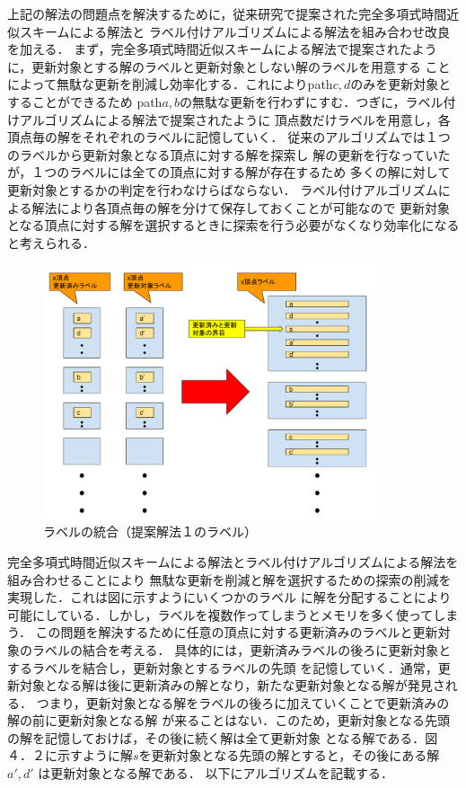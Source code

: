 \documentclass[12pt]{optlab-bachelor}
\begin{document}
上記の解法の問題点を解決するために，従来研究で提案された完全多項式時間近似スキームによる解法と
ラベル付けアルゴリズムによる解法を組み合わせ改良を加える．
まず，完全多項式時間近似スキームによる解法で提案されたように，更新対象とする解のラベルと更新対象としない解のラベルを用意する
ことによって無駄な更新を削減し効率化する．これによりpath$c,d$のみを更新対象とすることができるため
path$a,b$の無駄な更新を行わずにすむ．つぎに，ラベル付けアルゴリズムによる解法で提案されたように
頂点数だけラベルを用意し，各頂点毎の解をそれぞれのラベルに記憶していく．
従来のアルゴリズムでは１つのラベルから更新対象となる頂点に対する解を探索し
解の更新を行なっていたが，１つのラベルには全ての頂点に対する解が存在するため
多くの解に対して更新対象とするかの判定を行わなけらばならない．
ラベル付けアルゴリズムによる解法により各頂点毎の解を分けて保存しておくことが可能なので
更新対象となる頂点に対する解を選択するときに探索を行う必要がなくなり効率化になると考えられる．


\begin{figure}[htbp]
  \centering
  \caption{ラベルの統合（提案解法１のラベル）}
  \includegraphics[width=10.0cm]{fig/fig4.pdf}
\end{figure}

完全多項式時間近似スキームによる解法とラベル付けアルゴリズムによる解法を組み合わせることにより
無駄な更新を削減と解を選択するための探索の削減を実現した．これは図に示すようにいくつかのラベル
に解を分配することにより可能にしている．しかし，ラベルを複数作ってしまうとメモリを多く使ってしまう．
この問題を解決するために任意の頂点に対する更新済みのラベルと更新対象のラベルの結合を考える．
具体的には，更新済みラベルの後ろに更新対象とするラベルを結合し，更新対象とするラベルの先頭
を記憶していく．通常，更新対象となる解は後に更新済みの解となり，新たな更新対象となる解が発見される．
つまり，更新対象となる解をラベルの後ろに加えていくことで更新済みの解の前に更新対象となる解
が来ることはない．このため，更新対象となる先頭の解を記憶しておけば，その後に続く解は全て更新対象
となる解である．図４．２に示すように解$s$を更新対象となる先頭の解とすると，その後にある解$a',d'$
は更新対象となる解である．
以下にアルゴリズムを記載する．
\end{document}

